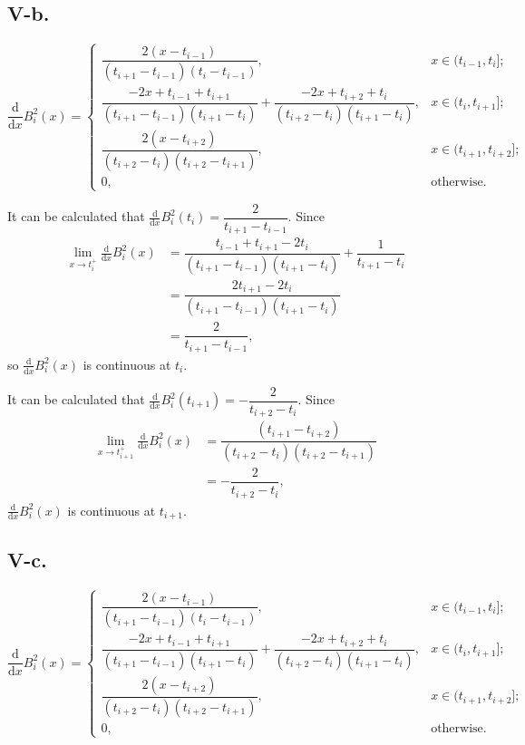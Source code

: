 \documentclass[a4paper]{article}
\begin{document}
\subsection*{V-b.}
$$
\frac{\mathrm{d}}{\mathrm{d}x}B_i^2(x)=\begin{cases}
  \dfrac{2(x-t_{i-1})}{(t_{i+1}-t_{i-1})(t_i-t_{i-1})},&x\in(t_{i-1},t_i];\\
  \dfrac{-2x+t_{i-1}+t_{i+1}}{(t_{i+1}-t_{i-1})(t_{i+1}-t_i)}+\dfrac{-2x+t_{i+2}+t_i}{(t_{i+2}-t_i)(t_{i+1}-t_i)},&x\in(t_i,t_{i+1}];\\
  \dfrac{2(x-t_{i+2})}{(t_{i+2}-t_i)(t_{i+2}-t_{i+1})},&x\in(t_{i+1},t_{i+2}];\\
  0,&\text{otherwise.}
\end{cases}
$$

It can be calculated that $\frac{\mathrm{d}}{\mathrm{d}x}B_i^2(t_i)=\dfrac{2}{t_{i+1}-t_{i-1}}$. Since
$$
\begin{aligned}
  \lim_{x\rightarrow t_{i}^+} \frac{\mathrm{d}}{\mathrm{d}x}B_i^2(x)&=\dfrac{t_{i-1}+t_{i+1}-2t_i}{(t_{i+1}-t_{i-1})(t_{i+1}-t_i)}+\dfrac{1}{t_{i+1}-t_i}\\
  &=\dfrac{2t_{i+1}-2t_i}{(t_{i+1}-t_{i-1})(t_{i+1}-t_i)}\\
  &=\dfrac{2}{t_{i+1}-t_{i-1}},
\end{aligned}
$$
so $\frac{\mathrm{d}}{\mathrm{d}x}B_i^2(x)$ is continuous at $t_i$.

It can be calculated that $\frac{\mathrm{d}}{\mathrm{d}x}B_i^2(t_{i+1})=-\dfrac{2}{t_{i+2}-t_{i}}$. Since
$$
\begin{aligned}
  \lim_{x\rightarrow t_{i+1}^+} \frac{\mathrm{d}}{\mathrm{d}x}B_i^2(x)&=\dfrac{(t_{i+1}-t_{i+2})}{(t_{i+2}-t_{i})(t_{i+2}-t_{i+1})}\\
  &=-\dfrac{2}{t_{i+2}-t_{i}},
\end{aligned}
$$
$\frac{\mathrm{d}}{\mathrm{d}x}B_i^2(x)$ is continuous at $t_{i+1}$.

\subsection*{V-c.}
$$
\frac{\mathrm{d}}{\mathrm{d}x}B_i^2(x)=\begin{cases}
  \dfrac{2(x-t_{i-1})}{(t_{i+1}-t_{i-1})(t_i-t_{i-1})},&x\in(t_{i-1},t_i];\\
  \dfrac{-2x+t_{i-1}+t_{i+1}}{(t_{i+1}-t_{i-1})(t_{i+1}-t_i)}+\dfrac{-2x+t_{i+2}+t_i}{(t_{i+2}-t_i)(t_{i+1}-t_i)},&x\in(t_i,t_{i+1}];\\
  \dfrac{2(x-t_{i+2})}{(t_{i+2}-t_i)(t_{i+2}-t_{i+1})},&x\in(t_{i+1},t_{i+2}];\\
  0,&\text{otherwise.}
\end{cases}
$$
\end{document}
